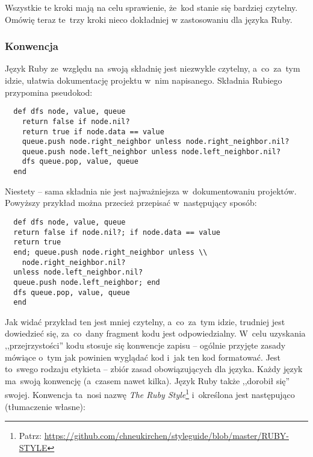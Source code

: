 Wszystkie te kroki mają na celu sprawienie, że~kod stanie się bardziej czytelny. Omówię teraz te~trzy kroki nieco dokładniej w zastosowaniu dla języka Ruby.


\subsubsection{Konwencja} \label{dokumentacja.konwencja}

Język Ruby ze~względu na~swoją składnię jest niezwykle czytelny, a~co~za~tym idzie, ułatwia dokumentację projektu w~nim napisanego. Składnia Rubiego przypomina pseudokod:

   \label{code.simpleruby}
  \begin{lstlisting}
  def dfs node, value, queue
    return false if node.nil?
    return true if node.data == value
    queue.push node.right_neighbor unless node.right_neighbor.nil?
    queue.push node.left_neighbor unless node.left_neighbor.nil?
    dfs queue.pop, value, queue
  end
  \end{lstlisting}

Niestety -- sama składnia nie jest najważniejsza w~dokumentowaniu projektów. Powyższy przykład można przecież przepisać w~następujący sposób:

  \begin{lstlisting}
  def dfs node, value, queue
  return false if node.nil?; if node.data == value
  return true
  end; queue.push node.right_neighbor unless \\
    node.right_neighbor.nil?
  unless node.left_neighbor.nil?
  queue.push node.left_neighbor; end
  dfs queue.pop, value, queue
  end
  \end{lstlisting}

Jak widać przykład ten jest mniej czytelny, a~co~za~tym idzie, trudniej jest dowiedzieć się, za~co~dany fragment kodu jest odpowiedzialny. W~celu uzyskania ,,przejrzystości'' kodu stosuje się konwencje zapisu -- ogólnie przyjęte zasady mówiące o~tym jak powinien wyglądać kod i~jak ten kod formatować. Jest to~swego rodzaju etykieta -- zbiór zasad obowiązujących dla języka. Każdy język ma~swoją konwencję (a~czasem nawet kilka). Język Ruby także ,,dorobił się'' swojej. Konwencja ta~nosi nazwę \textit{The Ruby Style}\footnote{Patrz: \url{https://github.com/chneukirchen/styleguide/blob/master/RUBY-STYLE}} i~określona jest następująco (tłumaczenie własne):

